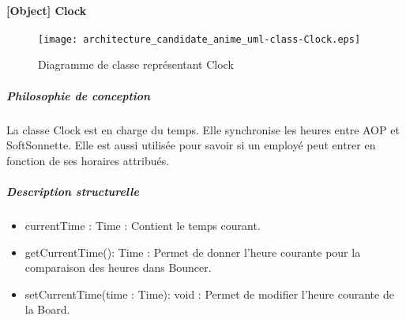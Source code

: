 \newpage

    \paragraph{[Object] Clock}%
    \begin{figure} [H]
        \centering
        \texttt{[image: architecture\_candidate\_anime\_uml-class-Clock.eps]}
        \caption{Diagramme de classe représentant Clock}
        \label{Classe_Clock}
    \end{figure}
        \subparagraph{Philosophie de conception}%
        La classe Clock est en charge du temps.
        Elle synchronise les heures entre AOP et SoftSonnette.
        Elle est aussi utilisée pour savoir si un employé peut entrer en fonction de ses horaires attribués. 
        \subparagraph{Description structurelle}%
            \begin{itemize}
                \item {currentTime : Time : Contient le temps courant.}
            \end{itemize}
            \begin{itemize}
                \item {getCurrentTime(): Time : Permet de donner l'heure courante pour la comparaison des heures dans Bouncer.}
                \item {setCurrentTime(time : Time): void : Permet de modifier l'heure courante de la Board.}
            \end{itemize}
\newpage

